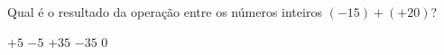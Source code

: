 Qual é o resultado da operação entre os números inteiros $(-15) + (+20)$?

$+5$
$-5$
$+35$
$-35$
$0$




